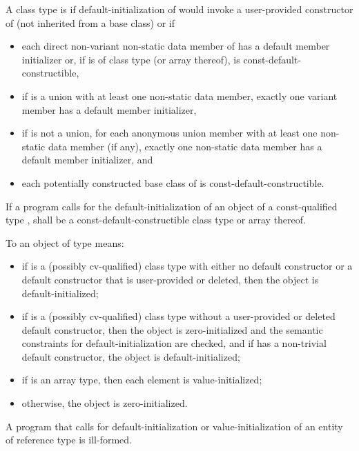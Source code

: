 A class type  is  if
default-initialization of  would invoke
a user-provided constructor of  (not inherited from a base class)
or if
\begin{itemize}
\item
each direct non-variant non-static data member  of 
has a default member initializer
or, if  is of class type  (or array thereof),
 is const-default-constructible,
\item
if  is a union with at least one non-static data member,
exactly one variant member has a default member initializer,
\item
if  is not a union,
for each anonymous union member with at least one non-static data member (if any),
exactly one non-static data member has a default member initializer, and
\item
each potentially constructed base class of  is const-default-constructible.
\end{itemize}

If a program calls for the default-initialization of an object of a
const-qualified type ,
 shall be a const-default-constructible class type or array thereof.

\pnum
To
an object of type
means:
\begin{itemize}
\item
if
is a (possibly cv-qualified) class type with
either no default constructor or a default
constructor that is user-provided or deleted, then the object is default-initialized;

\item
if
is a (possibly cv-qualified) class type without a
user-provided or deleted default constructor,
then the object is zero-initialized and the semantic constraints for
default-initialization are checked, and if  has a
non-trivial default constructor, the object is default-initialized;

\item
if
is an array type, then each element is value-initialized;

\item
otherwise, the object is zero-initialized.
\end{itemize}

\pnum
A program that calls for default-initialization
or value-initialization
of an entity
of reference type is ill-formed.

